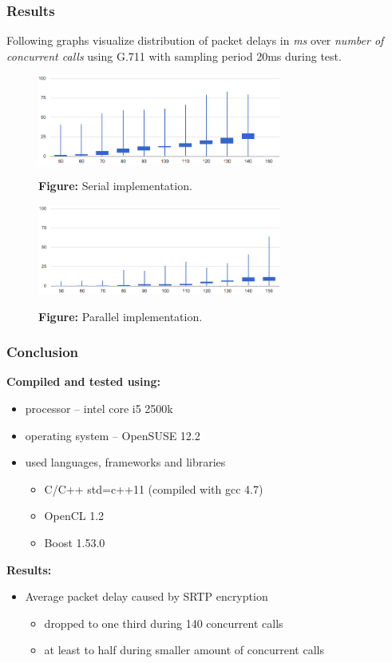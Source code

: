 \documentclass[10pt, xcolor=pdflatex, dvipsnames, table]{beamer}
\begin{document}
\begin{frame}
\frametitle{Results}
\footnotesize{Following graphs visualize distribution of packet delays in \textit{ms} over
\textit{number of concurrent calls} using G.711 with sampling period 20ms during test.}

\begin{figure}[H]
\centering
\includegraphics[width=8cm,keepaspectratio]{img/cpu.png}

\footnotesize{\textbf{Figure:} Serial implementation.}
\end{figure}

\vspace{-1em}

\begin{figure}[H]
\centering
\includegraphics[width=8cm,keepaspectratio]{img/gpu.png}

\footnotesize{\textbf{Figure:} Parallel implementation.}
\end{figure}
\end{frame}





\begin{frame}
\frametitle{Conclusion}
\textbf{Compiled and tested using:}
\begin{itemize}
\item processor -- intel core i5 2500k
\item operating system -- OpenSUSE 12.2
\item used languages, frameworks and libraries 
  \begin{itemize}
  \item C/C++ std=c++11 (compiled with gcc 4.7)
  \item OpenCL 1.2
  \item Boost 1.53.0
  \end{itemize}
\end{itemize}

\vspace{1em}

\textbf{Results:}
\begin{itemize}
\item Average packet delay caused by SRTP encryption
  \begin{itemize}
    \item dropped to one third during 140 concurrent calls 
    \item at least to half during smaller amount of concurrent calls
  \end{itemize}
\end{itemize}
\end{frame}


\frame[plain]{\bluepage{}}
\end{document}
